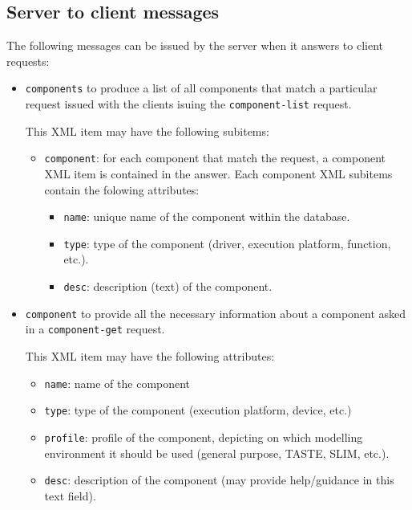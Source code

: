 \documentclass[11pt]{book}
\begin{document}
      \subsection{Server to client messages}
      The following messages can be issued by the server when it answers to
      client requests:
      \begin{itemize}
         \item
            \texttt{components} to produce a list of all components that match a
            particular request issued with the clients isuing the
            \texttt{component-list} request.

            This XML item may have the following subitems:
            \begin{itemize}
               \item
                  \texttt{component}: for each component that match the request,
                  a component XML item is contained in the answer. Each
                  component XML subitems contain the folowing attributes:
                  \begin{itemize}
                     \item
                        \texttt{name}: unique name of the component within the
                        database.
                     \item
                        \texttt{type}: type of the component (driver, execution
                        platform, function, etc.).
                     \item
                        \texttt{desc}: description (text) of the component.
                  \end{itemize}
            \end{itemize}
         \item
            \texttt{component} to provide all the necessary information about
            a component asked in a \texttt{component-get} request.
            
            This XML item may have the following attributes:
            \begin{itemize}
               \item
                  \texttt{name}: name of the component
               \item
                  \texttt{type}: type of the component (execution platform,
                  device, etc.)
               \item
                  \texttt{profile}: profile of the component, depicting on which
                  modelling environment it should be used (general purpose,
                  TASTE, SLIM, etc.).
               \item
                  \texttt{desc}: description of the component (may provide
                  help/guidance in this text field).
            \end{itemize}



\end{itemize}
\end{document}
